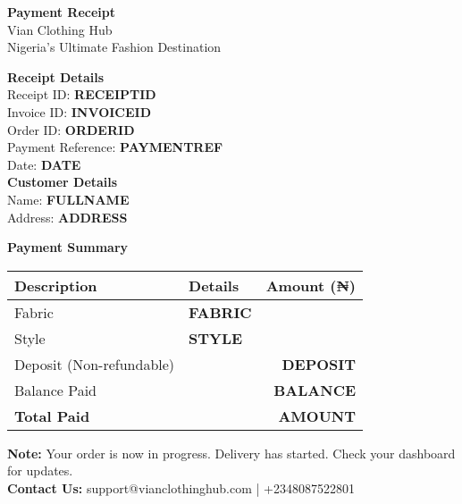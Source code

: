 \documentclass[a4paper,12pt]{article}
\begin{document}
\begin{center}
    {\color{vianpurple}\textbf{\LARGE Payment Receipt}} \\
    \vspace{0.5cm}
    Vian Clothing Hub \\
    Nigeria's Ultimate Fashion Destination \\
    \vspace{0.5cm}
\end{center}

\begin{flushleft}
    \textbf{Receipt Details} \\
    Receipt ID: \textbf{RECEIPTID} \\
    Invoice ID: \textbf{INVOICEID} \\
    Order ID: \textbf{ORDERID} \\
    Payment Reference: \textbf{PAYMENTREF} \\
    Date: \textbf{DATE} \\
    \vspace{0.5cm}
    \textbf{Customer Details} \\
    Name: \textbf{FULLNAME} \\
    Address: \textbf{ADDRESS} \\
\end{flushleft}

\begin{center}
    \vspace{0.5cm}
    \textbf{Payment Summary}
    \begin{tabular}{llr}
        \toprule
        \textbf{Description} & \textbf{Details} & \textbf{Amount (₦)} \\
        \midrule
        Fabric & \textbf{FABRIC} & \\
        Style & \textbf{STYLE} & \\
        \midrule
        Deposit (Non-refundable) & & \textbf{DEPOSIT} \\
        Balance Paid & & \textbf{BALANCE} \\
        \midrule
        \textbf{Total Paid} & & \textbf{AMOUNT} \\
        \bottomrule
    \end{tabular}
\end{center}

\vspace{1cm}

\begin{flushleft}
    \textbf{Note:} Your order is now in progress. Delivery has started. Check your dashboard for updates. \\
    \textbf{Contact Us:} support@vianclothinghub.com | +2348087522801
\end{flushleft}
\end{document}
